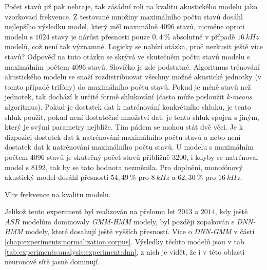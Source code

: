 Počet stavů již pak nehraje, tak zásádní roli na kvalitu akustického modelu jako vzorkovací frekvence. Z testované množiny maximálního počtu stavů dosáhl nejlepšího výsledku model, který měl maximálně $4096$ stavů, nicméne oproti modelu s $1024$ stavy je nárůst přesnosti pouze $0,4\ \%$ absolutně v případě $16\ kHz$ modelů, což není tak významné. Logicky se nabízí otázka, proč nezkusit ještě více stavů? Odpověď na tuto otázku se skrývá ve skutečném počtu stavů modelu s maximálním počtem $4096$ stavů. Slovíčko  je zde podstatné. Algoritmus trénování akustického modelu se snaží rozdistribuovat všechny možné akustické jednotky (v tomto případě trifóny) do maximálního počtu stavů. Pokud je méně stavů než jednotek, tak dochází k určité formě shlukování (často může posloužit \textit{k-means} algoritmus). Pokud je dostatek dat k natrénování konkrétního shluku, je tento shluk použit, pokud není dostatečné množství dat, je tento shluk spojen s jiným, který je svými parametry nejblíže. Tím pádem se mohou stát dvě věci. Je k dizpozici dostatek dat k natrénování maximálního počtu stavů a nebo není dostatek dat k natrénování maximálního počtu stavů. U modelu s maximálním počtem $4096$ stavů je skutečný počet stavů přibližně $3200$, i kdyby se natrénoval model s $8192$, tak by se tato hodnota nezměnila. Pro doplnění, monofónový akustický model dosáhl přesnosti $54,49\ \%$ pro $8\ kHz$ a $62,30\ \%$ pro $16\ kHz$.

\begin{table}[htpb]
  \centering
  \def\arraystretch{1.5}
  \caption{Vliv frekvence na kvalitu modelu.}
  \label{tab:experiments:analysis:experiment:gmm}
\end{table}

Jelikož tento experiment byl realizován na přelomu let $2013$ a $2014$, kdy ještě $ASR$ modelům dominovaly \textit{GMM-HMM} modely, byl později zopakován s \textit{DNN-HMM} modely, které dosahují ještě vyšších přesností. Více o \textit{DNN-GMM} v části \ref{chap:experiments:normalization:corpus}. Výsledky těchto modelů jsou v tab. \ref{tab:experiments:analysis:experiment:dnn}, z nich je vidět, že i v této oblasti neuronové sítě jasně dominují.

